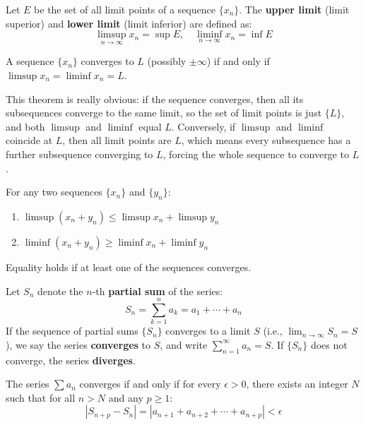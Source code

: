 \begin{definition}
Let $E$ be the set of all limit points of a sequence $\{x_n\}$. The \textbf{upper limit} (limit superior) and \textbf{lower limit} (limit inferior) are defined as:
\[ \limsup_{n \to \infty} x_n = \sup E, \quad \liminf_{n \to \infty} x_n = \inf E \]
\end{definition}

\begin{theorem}
A sequence $\{x_n\}$ converges to $L$ (possibly $\pm \infty$) if and only if $\limsup x_n = \liminf x_n = L$.
\end{theorem}

This theorem is really obvious: if the sequence converges, then all its subsequences converge to the same limit, so the set of limit points is just $\{L\}$, and both $\limsup$ and $\liminf$ equal $L$. Conversely, if $\limsup$ and $\liminf$ coincide at $L$, then all limit points are $L$, which means every subsequence has a further subsequence converging to $L$, forcing the whole sequence to converge to $L$.

\begin{property}
For any two sequences $\{x_n\}$ and $\{y_n\}$:
\begin{enumerate}
    \item $\limsup (x_n + y_n) \le \limsup x_n + \limsup y_n$
    \item $\liminf (x_n + y_n) \ge \liminf x_n + \liminf y_n$
\end{enumerate}
Equality holds if at least one of the sequences converges.
\end{property}

\begin{definition}[Convergence]
Let $S_n$ denote the $n$-th \textbf{partial sum} of the series:
\[ S_n = \sum_{k=1}^{n} a_k = a_1 + \cdots + a_n \]
If the sequence of partial sums $\{S_n\}$ converges to a limit $S$ (i.e., $\lim_{n \to \infty} S_n = S$), we say the series \textbf{converges} to $S$, and write $\sum_{n=1}^{\infty} a_n = S$.
If $\{S_n\}$ does not converge, the series \textbf{diverges}.
\end{definition}

\begin{theorem}
The series $\sum a_n$ converges if and only if for every $\epsilon > 0$, there exists an integer $N$ such that for all $n > N$ and any $p \ge 1$:
\[ |S_{n+p} - S_n| = |a_{n+1} + a_{n+2} + \cdots + a_{n+p}| < \epsilon \]
\end{theorem}

